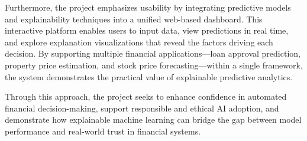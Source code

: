 Furthermore, the project emphasizes usability by integrating predictive models and explainability techniques into a unified web-based dashboard. This interactive platform enables users to input data, view predictions in real time, and explore explanation visualizations that reveal the factors driving each decision. By supporting multiple financial applications---loan approval prediction, property price estimation, and stock price forecasting---within a single framework, the system demonstrates the practical value of explainable predictive analytics.

Through this approach, the project seeks to enhance confidence in automated financial decision-making, support responsible and ethical AI adoption, and demonstrate how explainable machine learning can bridge the gap between model performance and real-world trust in financial systems.
